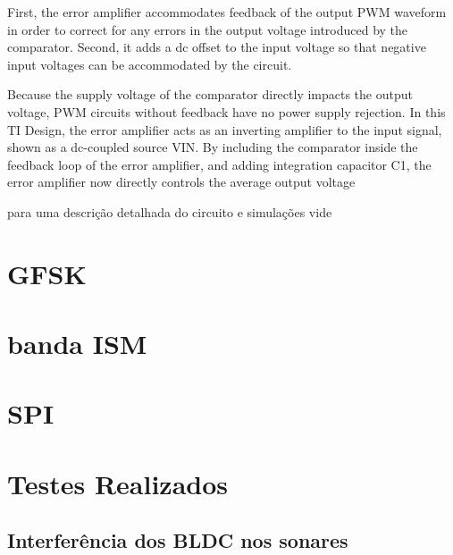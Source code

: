    First, the error amplifier accommodates feedback of the output PWM waveform in order to correct for any errors in the
output voltage introduced by the comparator. Second, it adds a dc offset to the input voltage so that negative input voltages can be accommodated by 
the circuit.
 
 Because the supply voltage of the comparator directly impacts the output voltage, PWM circuits without feedback have no power supply rejection. In 
this TI Design, the error amplifier acts as an inverting amplifier to the input signal, shown as a dc-coupled source VIN. By including the comparator 
inside the feedback loop of the error amplifier, and adding integration capacitor C1, the error amplifier now directly controls the average output 
voltage



para uma descrição detalhada do circuito e simulações vide \cite{pwm_modulator}

\section{GFSK}

\section{banda ISM}

\section{SPI}

\section{Testes Realizados}
\subsection{Interferência dos BLDC nos sonares}
